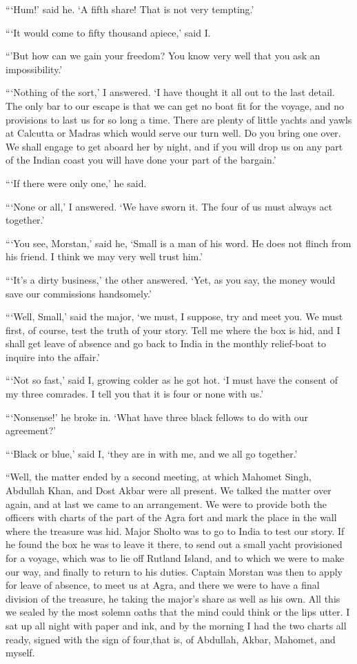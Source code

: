 \documentclass[12pt,english,oneside]{book}
\begin{document}
{}```Hum!' said he. `A fifth share! That is not very tempting.'

{}```It would come to fifty thousand apiece,' said I.

{}``'But how can we gain your freedom? You know very well that you
ask an impossibility.'

{}```Nothing of the sort,' I answered. `I have thought it all out
to the last detail. The only bar to our escape is that we can get
no boat fit for the voyage, and no provisions to last us for so long
a time. There are plenty of little yachts and yawls at Calcutta or
Madras which would serve our turn well. Do you bring one over. We
shall engage to get aboard her by night, and if you will drop us on
any part of the Indian coast you will have done your part of the bargain.'

{}```If there were only one,' he said.

{}```None or all,' I answered. `We have sworn it. The four of us
must always act together.'

{}```You see, Morstan,' said he, `Small is a man of his word. He
does not flinch from his friend. I think we may very well trust him.'

{}```It's a dirty business,' the other answered. `Yet, as you say,
the money would save our commissions handsomely.'

{}```Well, Small,' said the major, `we must, I suppose, try and meet
you. We must first, of course, test the truth of your story. Tell
me where the box is hid, and I shall get leave of absence and go back
to India in the monthly relief-boat to inquire into the affair.'

{}```Not so fast,' said I, growing colder as he got hot. `I must
have the consent of my three comrades. I tell you that it is four
or none with us.'

{}```Nonsense!' he broke in. `What have three black fellows to do
with our agreement?'

{}```Black or blue,' said I, `they are in with me, and we all go
together.'

{}``Well, the matter ended by a second meeting, at which Mahomet
Singh, Abdullah Khan, and Dost Akbar were all present. We talked the
matter over again, and at last we came to an arrangement. We were
to provide both the officers with charts of the part of the Agra fort
and mark the place in the wall where the treasure was hid. Major Sholto
was to go to India to test our story. If he found the box he was to
leave it there, to send out a small yacht provisioned for a voyage,
which was to lie off Rutland Island, and to which we were to make
our way, and finally to return to his duties. Captain Morstan was
then to apply for leave of absence, to meet us at Agra, and there
we were to have a final division of the treasure, he taking the major's
share as well as his own. All this we sealed by the most solemn oaths
that the mind could think or the lips utter. I sat up all night with
paper and ink, and by the morning I had the two charts all ready,
signed with the sign of four,\mdsh{---}that is, of Abdullah, Akbar,
Mahomet, and myself.
\end{document}
